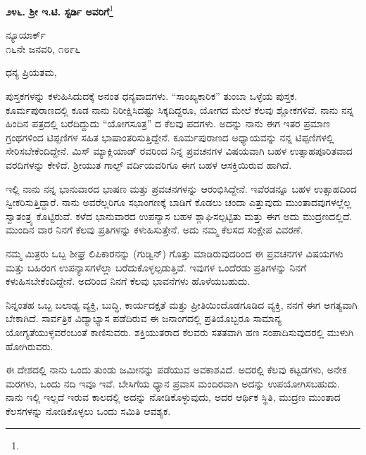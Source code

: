 {\flushright
{\fontsize{12.7pt}{13.8pt}\selectfont{ನಿನ್ನ ವಿಶ್ವಾಸಪೂರ್ವಕ\\ವಿವೇಕಾನಂದ}}
\par}

\begin{center}
\textbf{೨೪೬. ಶ‍್ರೀ ಇ.ಟಿ. ಸ್ಟರ್ಡಿ ಅವರಿಗೆ}\footnote{}
\end{center}

\vspace{-0.5cm}

\begin{flushright}
ನ್ಯೂಯಾರ್ಕ್\\೧೬ನೇ ಜನವರಿ, ೧೮೯೬
\end{flushright}

\vspace{-0.3cm}

\noindent
ಧನ್ಯ ಪ್ರಿಯತಮ,

ಪುಸ್ತಕಗಳನ್ನು ಕಳುಹಿಸಿದುದಕ್ಕೆ ಅನಂತ ಧನ್ಯವಾದಗಳು. “ಸಾಂಖ್ಯಕಾರಿಕ” ತುಂಬಾ ಒಳ್ಳೆಯ ಪುಸ್ತಕ. ಕೂರ್ಮಪುರಾಣದಲ್ಲಿ ಕೂಡ ನಾನು ನಿರೀಕ್ಷಿಸಿದಷ್ಟು ಸಿಕ್ಕದಿದ್ದರೂ, ಯೋಗದ ಮೇಲೆ ಕೆಲವು ಶ್ಲೋಕಗಳಿವೆ. ನಾನು ನನ್ನ ಹಿಂದಿನ ಪತ್ರದಲ್ಲಿ ಬರೆದಿದ್ದುದು “ಯೋಗಸೂತ್ರ” ದ ಕೆಲವು ಪದಗಳು. ಅದನ್ನು ನಾನು ಈಗ ಇತರ ಪ್ರಮಾಣ ಗ್ರಂಥಗಳಿಂದ ಟಿಪ್ಪಣಿಗಳ ಸಹಿತ ಭಾಷಾಂತರಿಸುತ್ತಿದ್ದೇನೆ. ಕೂರ್ಮಪುರಾಣದ ಅಧ್ಯಾಯವನ್ನು ನನ್ನ ಟಿಪ್ಪಣಿಗಳಲ್ಲಿ ಸೇರಿಸಬೇಕೆಂದಿದ್ದೇನೆ. ಮಿಸ್ ಮ್ಯಾಕ್ಲಿಯಾಡ್ ರವರಿಂದ ನಿನ್ನ ಪ್ರವಚನಗಳ ವಿಷಯವಾಗಿ ಬಹಳ ಉತ್ಸಾಹಪೂರಿತವಾದ ವರದಿಗಳನ್ನು ಕೇಳಿದೆ. ಶ‍್ರೀಯುತ ಗಾಲ್ಫ್ ವರ್ದಿಯವರಿಗೂ ಈಗ ಬಹಳ ಆಸಕ್ತಿಯಿರುವ ಹಾಗಿದೆ.

ಇಲ್ಲಿ ನಾನು ನನ್ನ ಭಾನುವಾರದ ಭಾಷಣ ಮತ್ತು ಪ್ರವಚನಗಳನ್ನು ಆರಂಭಿಸಿದ್ದೇನೆ. ಇವೆರಡನ್ನೂ ಬಹಳ ಉತ್ಸಾಹದಿಂದ ಸ್ವೀಕರಿಸುತ್ತಿದ್ದಾರೆ. ನಾನು ಅವರೆಲ್ಲರಿಗೂ ಸಭಾಂಗಣಕ್ಕೆ ಬಾಡಿಗೆ ಕೊಡಲು ಚಂದಾ ಎತ್ತುವುದು ಮುಂತಾದವುಗಳಲ್ಲೆಲ್ಲ ಸ್ವಾತಂತ್ರ್ಯ ಕೊಟ್ಟಿರುವೆ. ಕಳೆದ ಭಾನುವಾರದ ಉಪನ್ಯಾಸ ಬಹಳ ಶ್ಲಾಘಿಸಲ್ಪಟ್ಟಿತು ಮತ್ತು ಈಗ ಅದು ಮುದ್ರಣದಲ್ಲಿದೆ. ಮುಂದಿನ ವಾರ ನಿನಗೆ ಕೆಲವು ಪ್ರತಿಗಳನ್ನು ಕಳುಹಿಸುತ್ತೇನೆ. ಅದು ನಮ್ಮ ಕೆಲಸದ ಸಂಕ್ಷೇಪ ವಿವರಣೆ.

ನಮ್ಮ ಮಿತ್ರರು ಒಬ್ಬ ಶೀಘ್ರ ಲಿಪಿಕಾರನನ್ನು (ಗುಡ್ವಿನ್) ಗೊತ್ತು ಮಾಡಿರುವುದರಿಂದ ಈ ಪ್ರವಚನಗಳ ವಿಷಯಗಳು ಮತ್ತು ಬಹಿರಂಗ ಉಪನ್ಯಾಸಗಳೆಲ್ಲಾ ಬರೆದುಕೊಳ್ಳಲ್ಪಡುತ್ತಿವೆ. ಇವುಗಳ ಒಂದೆರಡು ಪ್ರತಿಗಳನ್ನು ನಿನಗೆ ಕಳುಹಿಸಬೇಕೆಂದಿದ್ದೇನೆ. ಅದರಿಂದ ನಿನಗೆ ಕೆಲವು ಭಾವನೆಗಳು ಹೊಳೆಯಬಹುದು.

ನಿನ್ನಂತಹ ಒಬ್ಬ ಬಲಾಢ್ಯ ವ್ಯಕ್ತಿ, ಬುದ್ಧಿ, ಕಾರ್ಯದಕ್ಷತೆ ಮತ್ತು ಪ್ರೀತಿಯಿಂದೊಡಗೂಡಿದ ವ್ಯಕ್ತಿ, ನನಗೆ ಈಗ ಅಗತ್ಯವಾಗಿ ಬೇಕಾಗಿದೆ. ಸಾರ್ವತ್ರಿಕ ವಿದ್ಯಾಭ್ಯಾಸ ಪಡೆದಿರುವ ಈ ಜನಾಂಗದಲ್ಲಿ ಪ್ರತಿಯೊಬ್ಬರೂ ಸಾಮಾನ್ಯ ಯೋಗ್ಯತೆಯುಳ್ಳವರೆಂಬಂತೆ ಕಾಣಿಸುವರು. ಶಕ್ತಿಯುತರಾದ ಕೆಲವರು ಸತತವಾಗಿ ಹಣ ಸಂಪಾದಿಸುವುದರಲ್ಲಿ ಮುಳುಗಿ ಹೋಗಿರುವರು.

ಈ ದೇಶದಲ್ಲಿ ನಾನು ಒಂದು ತುಂಡು ಜಮೀನನ್ನು ಪಡೆಯುವ ಅವಕಾಶವಿದೆ. ಅದರಲ್ಲಿ ಕೆಲವು ಕಟ್ಟಡಗಳು, ಅನೇಕ ಮರಗಳು, ಒಂದು ನದಿ ಇವೂ ಇವೆ. ಬೇಸಿಗೆಯ ಧ್ಯಾನ ಪ್ರವಾಸ ಮಂದಿರವಾಗಿ ಅದನ್ನು ಉಪಯೋಗಿಸಬಹುದು. ನಾನು ಇಲ್ಲಿ ಇಲ್ಲದೆ ಇರುವ ಕಾಲದಲ್ಲಿ ಅದನ್ನು ನೋಡಿಕೊಳ್ಳುವುದು, ಅದರ ಆರ್ಥಿಕ ಸ್ಥಿತಿ, ಮುದ್ರಣ ಮುಂತಾದ ಕೆಲಸಗಳನ್ನು ನೋಡಿಕೊಳ್ಳಲು ಒಂದು ಸಮಿತಿ ಆವಶ್ಯಕ.

